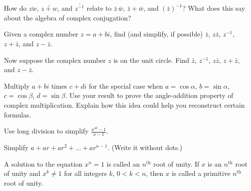 \documentclass[space,nooutcomes]{ximera}
\begin{document}
\begin{problem}
How do $\bar{zw}$, $\bar{z+w}$, and $\bar{z^{-1}}$ relate to $\bar{z}\,\bar{w}$, $\bar{z}+\bar{w}$, and $(\bar{z})^{-1}$?  What does this say about the algebra of complex conjugation?  
\vfill 
\end{problem}

\begin{problem}
Given a complex number $z=a+bi$, find (and simplify, if possible) $\bar{z}$, $z\bar{z}$, $z^{-1}$, $z+\bar{z}$, and $z-\bar{z}$.  
\vfill 
\end{problem}

\begin{problem}
Now suppose the complex number $z$ is on the unit circle.  Find $\bar{z}$, $z^{-1}$, $z\bar{z}$, $z+\bar{z}$, and $z-\bar{z}$.
\vfill 
\end{problem}


\newpage 


\begin{problem}
Multiply $a + bi$ times $c + di$ for the special case when $a=\cos\alpha$, $b=\sin\alpha$, 
$c=\cos\beta$, $d=\sin\beta$.  Use your result to prove the angle-addition property of complex multiplication.  Explain how this idea could help you reconstruct certain formulas.  
\vfill 
\end{problem}


\begin{problem}
Use long division to simplify $\frac{x^{43}-1}{x-1}$.
\vfill 
\end{problem}

\begin{problem}
Simplify $a+ar+ar^2+\dots+ar^{n-1}$.  (Write it without dots.)
\vfill 
\end{problem}

\newpage 


A solution to the equation $x^n=1$ is called an $n^\text{th}$  root of unity.  If $x$ is an $n^\text{th}$ root of unity and $x^k\ne 1$ for all integers $k$, $0<k<n$, then $x$ is called a primitive $n^\text{th}$ root of unity.  
\end{document}
